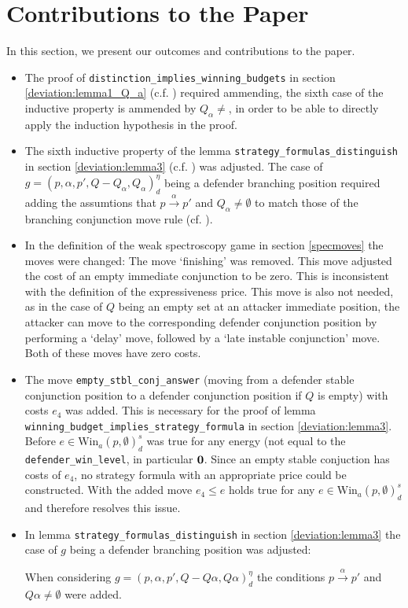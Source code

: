 \newpage
\section{Contributions to the Paper}
In this section, we present our outcomes and contributions to the paper.
\begin{itemize}
    \item The proof of \texttt{distinction\_implies\_winning\_budgets} in section \ref{deviation:lemma1_Q_a} 
    (c.f. \cite[lemma $1$]{bisping2023lineartimebranchingtime}) required ammending, the sixth case
    of the inductive property is ammended by $Q_\alpha \neq {}$, in order to be able to directly
    apply the induction hypothesis in the proof.

    \item The sixth inductive property of the lemma \texttt{strategy\_formulas\_distinguish} in section \ref{deviation:lemma3} 
    (c.f. \cite[lemma $3$]{bisping2023lineartimebranchingtime}) was adjusted.
    The case of $g=(p,\alpha ,p', Q- Q_\alpha, Q_\alpha)_d^\eta$ being a defender branching position
    required adding the assumtions that $p \overset{\alpha}{\longrightarrow} p'$ and $Q_\alpha \neq \emptyset$
    to match those of the branching conjunction move rule (cf. \cite[p. 13]{bisping2023lineartimebranchingtime}). 

    \item In the definition of the weak spectroscopy game in section \ref{specmoves} the moves were changed: 
    The move `finishing' was removed. This move adjusted the cost of an empty immediate conjunction to be zero.
    This is inconsistent with the definition of the expressiveness price. This move is also not needed, as in the case of $Q$ being an empty set at an attacker immediate position, the attacker can move to the corresponding
    defender conjunction position by performing a `delay' move, followed by a `late instable conjunction' move. Both of these moves have zero costs.

    \item The move \texttt{empty\_stbl\_conj\_answer} (moving from a defender stable conjunction position to a defender conjunction
    position if $Q$ is empty) with costs $e_4$ was added. This is necessary for the proof of lemma\\ 
    \texttt{winning\_budget\_implies\_strategy\_formula} in section \ref{deviation:lemma3}. Before 
    $e \in \text{Win}_a (p, \emptyset)_d^s $ was true for any energy (not equal to the \texttt{defender\_win\_level}, in particular $\bold{0}$. 
    Since an empty stable conjuction has costs of $e_4$, no strategy formula with an appropriate price could be constructed. 
    With the added move $e_4 \leq e $ holds true for any $e \in \text{Win}_a (p, \emptyset)_d^s $ and therefore resolves this issue.

    \item In lemma \texttt{strategy\_formulas\_distinguish} in section \ref{deviation:lemma3} the case of $g$ being a defender branching position was adjusted: 
    
    When considering $g=(p,\alpha ,p', Q- Q \alpha, Q \alpha)_d^\eta$ the conditions $p \overset{\alpha}{\longrightarrow} p'$ and $Q \alpha \neq \emptyset$ were added. 
\end{itemize}
